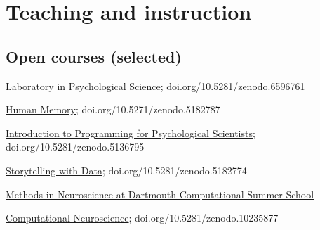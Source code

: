 \documentclass[11pt, a4paper]{article} %
\newcommand{\years}[1]{\marginnote{\footnotesize #1}} %
\begin{document}
\section*{Teaching and instruction}

  \subsection*{Open courses (selected)}

  \begin{etaremune}
\item \href{https://github.com/ContextLab/experimental-psychology}{Laboratory in Psychological Science};  doi.org/10.5281/zenodo.6596761
\item \href{https://github.com/ContextLab/human-memory}{Human
    Memory};  doi.org/10.5271/zenodo.5182787
\item  \href{https://github.com/ContextLab/cs-for-psych}{Introduction to
    Programming for Psychological Scientists};  doi.org/10.5281/zenodo.5136795
\item  \href{https://github.com/ContextLab/storytelling-with-data}{Storytelling
    with Data};  doi.org/10.5281/zenodo.5182774
\item  \href{http://mindsummerschool.org/}{Methods in Neuroscience at Dartmouth Computational
    Summer School}
\item \href{https://github.com/ContextLab/computational-neuroscience}{Computational Neuroscience}; doi.org/10.5281/zenodo.10235877
  \end{etaremune}

  

\end{document}
